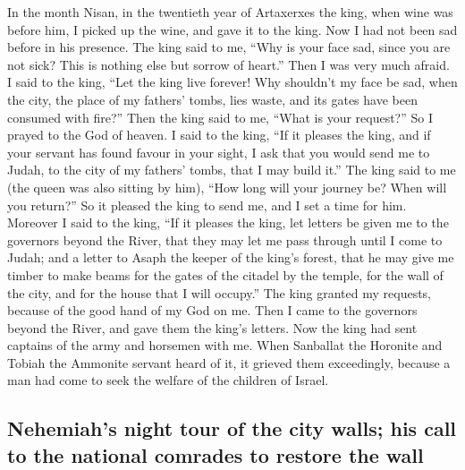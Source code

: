  In the month Nisan, in the twentieth year of Artaxerxes
the king, when wine was before him, I picked up the wine, and gave it to
the king. Now I had not been sad before in his presence. 
The king said to me, ``Why is your face sad, since you are not sick?
This is nothing else but sorrow of heart.'' Then I was very much afraid.
 I said to the king, ``Let the king live forever! Why
shouldn't my face be sad, when the city, the place of my fathers' tombs,
lies waste, and its gates have been consumed with fire?'' 
Then the king said to me, ``What is your request?'' So I prayed to the
God of heaven.  I said to the king, ``If it pleases the
king, and if your servant has found favour in your sight, I ask that you
would send me to Judah, to the city of my fathers' tombs, that I may
build it.''  The king said to me (the queen was also
sitting by him), ``How long will your journey be? When will you
return?'' So it pleased the king to send me, and I set a time for him.
 Moreover I said to the king, ``If it pleases the king,
let letters be given me to the governors beyond the River, that they may
let me pass through until I come to Judah;  and a letter
to Asaph the keeper of the king's forest, that he may give me timber to
make beams for the gates of the citadel by the temple, for the wall of
the city, and for the house that I will occupy.'' The king granted my
requests, because of the good hand of my God on me.  Then
I came to the governors beyond the River, and gave them the king's
letters. Now the king had sent captains of the army and horsemen with
me.  When Sanballat the Horonite and Tobiah the Ammonite
servant heard of it, it grieved them exceedingly, because a man had come
to seek the welfare of the children of Israel.

\hypertarget{nehemiahs-night-tour-of-the-city-walls-his-call-to-the-national-comrades-to-restore-the-wall}{%
\subsection{Nehemiah's night tour of the city walls; his call to the
national comrades to restore the
wall}\label{nehemiahs-night-tour-of-the-city-walls-his-call-to-the-national-comrades-to-restore-the-wall}}


